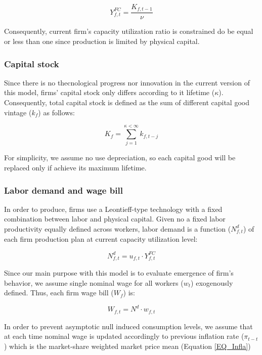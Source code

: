 \documentclass[12pt,openright,oneside,a4paper,english,sumario=tradicional]{gpsabntex}
\numberwithin{listing}{chapter}
\begin{document}
\begin{latex}
\begin{equation}
Y_{f,t}^{FC} = \frac{K_{f,t-1}}{\nu}
\end{equation}
\end{latex}
Consequently, current firm's capacity utilization ratio is constrained do be equal or less than one since production is limited by physical capital.



\subsubsection{Capital stock}
\label{sec:org272a0bc}


Since there is no thecnological progress nor innovation in the current version of this model, firms' capital stock only differs according to it lifetime (\(\kappa\)).
Consequently, total capital stock is defined as the sum of different capital good vintage (\(k_{f}\)) as follows:

\begin{latex}
\begin{equation}
K_{f} = \sum_{j=1}^{\kappa < \infty} k_{f,t-j}
\end{equation}
\end{latex}
For simplicity, we assume no use depreciation, so each capital good will be replaced only if achieve its maximum lifetime.

\subsubsection{Labor demand and wage bill}
\label{sec:org9740179}

In order to produce, firms use a Leontieff-type technology with a fixed combination between labor and physical capital.
Given no a fixed labor productivity equally defined across workers, labor demand is a function (\(N^{d}_{f,t}\)) of each firm production plan at current capacity utilization level:

\begin{latex}
\begin{equation}
N^{d}_{f,t} = u_{f,t}\cdot Y^{FC}_{f,t}
\end{equation}
\end{latex}

Since our main purpose with this model is to evaluate emergence of firm's behavior, we assume single nominal wage for all workers (\(w_{t}\)) exogenously defined.
Thus, each firm wage bill (\(W_{f}\)) is:
\begin{latex}
\begin{equation}
W_{f,t} = N^{d}\cdot w_{f,t}
\end{equation}
\end{latex}
In order to prevent asymptotic null induced consumption levels, we assume that at each time nominal wage is updated accordingly to previous inflation rate (\(\pi_{t-t}\)) which is the market-share weighted market price mean (Equation \ref{EQ_Infla})
\end{document}
